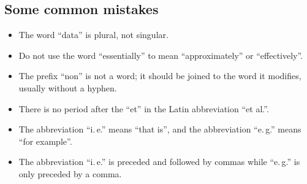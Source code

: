 \subsection{Some common mistakes}\label{eiceFe1u}
\begin{itemize}
	\item The word ``data'' is plural, not singular.
	\item Do not use the word ``essentially'' to mean ``approximately'' or
	``effectively''.
	\item The prefix ``non'' is not a word; it should be joined to the word it
	modifies, usually without a hyphen.
	\item There is no period after the ``et'' in the Latin abbreviation ``et
	al.''.
	\item The abbreviation ``i.\,e.'' means ``that is'', and the abbreviation
	``e.\,g.'' means ``for example''.
	\item The abbreviation ``i.\,e.'' is preceded and followed by commas while
	``e.\,g.'' is only preceded by a comma.

\end{itemize}
